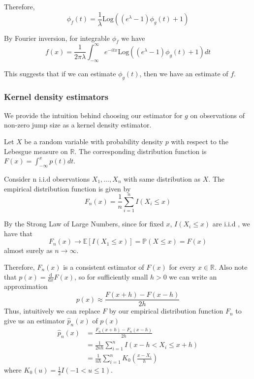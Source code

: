 \documentclass[a4paper,11pt]{article}
\theoremstyle{theorem}
\theoremstyle{definition}
\providecommand{\E}{\mathbb{E}}
\begin{document}
Therefore,
\begin{equation} \label{eq:charf}
\phi_{f}(t) = \frac{1}{\lambda}\text{Log}\left((e^{\lambda} - 1)\phi_{g}(t) + 1\right)
\end{equation} 

By Fourier inversion, for integrable $\phi_{f}$ we have
\begin{equation} \label{eq:fourier}
f(x) = \frac{1}{2\pi\lambda}\int_{-\infty}^{\infty}{e^{-itx}\text{Log}\left((e^{\lambda} - 1)\phi_{g}(t) + 1\right)}dt
\end{equation}

This suggests that if we can estimate $\phi_{g}(t)$, then we have an estimate of $f$.

\subsubsection{Kernel density estimators}

We provide the intuition behind choosing our estimator for $g$ on observations of non-zero jump size as a kernel density estimator.

Let $X$ be a random variable with probability density $p$ with respect to the Lebesgue measure on $\mathbb{R}$. The corresponding distribution function is $F(x) = \int_{-\infty}^{x}{p(t)}dt$.

Consider n i.i.d observations $X_{1}, \dotsc , X_{n}$ with same distribution as $X$. The empirical distribution function is given by 
\[
F_{n}(x) = \frac{1}{n}\sum_{i=1}^{n}{I(X_{i} \leq x)}
\]  

By the Strong Law of Large Numbers, since for fixed $x$, $I(X_{i} \leq x)$ are i.i.d , we have that
\[
F_{n}(x) \to \E \left[ I(X_{1} \leq x) \right] = \mathbb{P}(X \leq x) = F(x)
\]
almost surely as $n \to \infty$.

Therefore, $F_{n}(x)$ is a consistent estimator of $F(x)$ for every $x \in \mathbb{R}$. Also note that $p(x) = \frac{\mathrm{d}}{\mathrm{d}x}F(x)$, so for sufficiently small $h > 0$ we can write an approximation
\[
p(x) \approx \frac{F(x+h) - F(x-h)}{2h}
\]
Thus, intuitively we can replace $F$ by our empirical distribution function $F_{n}$ to give us an estimator $\hat{p}_{n}(x)$ of $p(x)$
\begin{align*}
\hat{p}_{n}(x) &= \frac{F_{n}(x+h) - F_{n}(x-h)}{2h} \\
               &= \frac{1}{2nh}\sum_{i=1}^{n}{I(x - h < X_{i} \leq x + h)} \\
               &= \frac{1}{nh}\sum_{i=1}^{n}{K_{0}\left(\frac{x - X_{i}}{h}\right)}
\end{align*}
where $K_{0}(u) = \frac{1}{2}I(-1 < u \leq 1)$.
\end{document}
